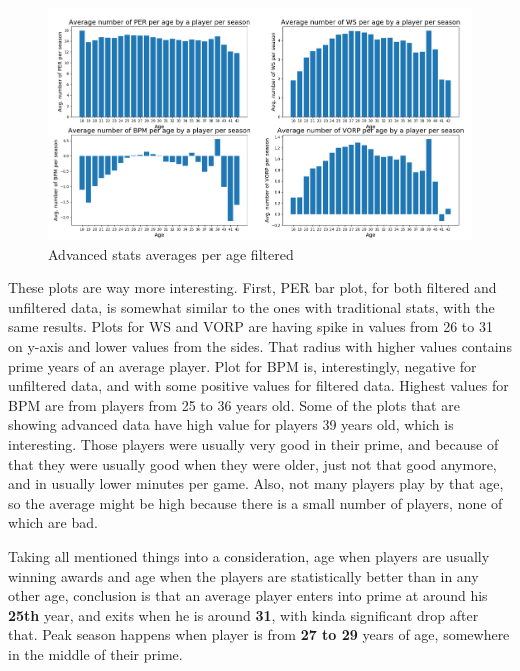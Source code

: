 \documentclass[a4paper]{article}
\begin{document}
\begin{figure}[h!]
\begin{center}
\includegraphics[scale=0.3]{advanced_stats_per_age_filtered.png}
\end{center}
\caption{Advanced stats averages per age filtered}
\label{plt:advanced_age_filtered}
\end{figure}

These plots are way more interesting. First, PER bar plot, for both filtered and unfiltered data, is somewhat similar to the ones with traditional stats, with the same results. Plots for WS and VORP are having spike in values from 26 to 31 on y-axis and lower values from the sides. That radius with higher values contains prime years of an average player. Plot for BPM is, interestingly, negative for unfiltered data, and with some positive values for filtered data. Highest values for BPM are from players from 25 to 36 years old. Some of the plots that are showing advanced data have high value for players 39 years old, which is interesting. Those players were usually very good in their prime, and because of that they were usually good when they were older, just not that good anymore, and in usually lower minutes per game. Also, not many players play by that age, so the average might be high because there is a small number of players, none of which are bad.

Taking all mentioned things into a consideration, age when players are usually winning awards and age when the players are statistically better than in any other age, conclusion is that an average player enters into prime at around his \textbf{25th} year, and exits when he is around \textbf{31}, with kinda significant drop after that. Peak season happens when player is from \textbf{27 to 29} years of age, somewhere in the middle of their prime.
\end{document}
